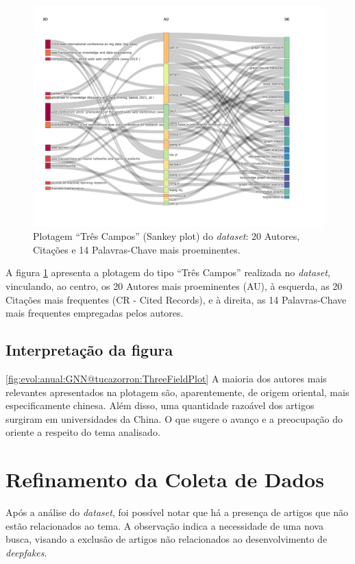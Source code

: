 \begin{figure}
    \centering
    \includegraphics[width=1\textwidth]{experiments/tucazorron/PesquisaBibliometrica/GNN/1.png}
    \caption{Plotagem ``Três Campos'' (Sankey plot) do \textit{dataset}: 20 Autores, Citações e 14 Palavras-Chave mais proeminentes.}
    \label{fig:GNN@tucazorron:ThreeFieldPlot}
\end{figure}

A figura \ref{fig:GNN@tucazorron:ThreeFieldPlot} apresenta a plotagem do tipo ``Três Campos'' realizada no \textit{dataset}, vinculando, ao centro, os 20 Autores mais proeminentes (AU), à esquerda, as 20 Citações mais frequentes (CR - Cited Records), e à direita, as 14 Palavras-Chave mais frequentes empregadas pelos autores.

\subsection{Interpretação da figura} \ref{fig:evol:anual:GNN@tucazorron:ThreeFieldPlot}
A maioria dos autores mais relevantes apresentados na plotagem são, aparentemente, de origem oriental, mais especificamente chinesa. Além disso, uma quantidade razoável dos artigos surgiram em universidades da China. O que sugere o avanço e a preocupação do oriente a respeito do tema analisado.

\section{Refinamento da Coleta de Dados}

Após a análise do \textit{dataset}, foi possível notar que há a presença de artigos que não estão relacionados ao tema. A observação indica a necessidade de uma nova busca, visando a exclusão de artigos não relacionados ao desenvolvimento de \textit{deepfakes}.


